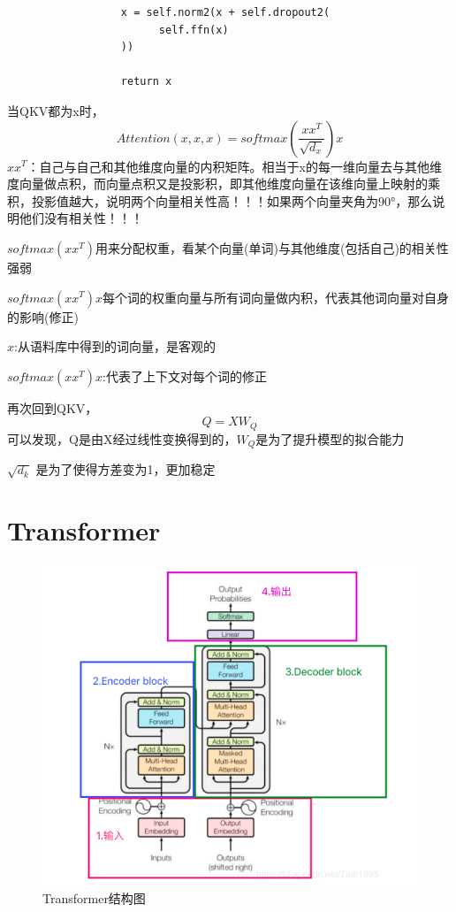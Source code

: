\documentclass[a4paper]{article}
\begin{document}
\begin{sloppypar}
\begin{lstlisting}
                  x = self.norm2(x + self.dropout2(
                        self.ffn(x)
                  ))

                  return x
      \end{lstlisting}

      当QKV都为x时，
      $$
            Attention(x,x,x)=softmax(\frac{xx^T}{\sqrt{d_x}})x
      $$
      $xx^T$：自己与自己和其他维度向量的内积矩阵。相当于x的每一维向量去与其他维度向量做点积，而向量点积又是投影积，即其他维度向量在该维向量上映射的乘积，投影值越大，说明两个向量相关性高！！！如果两个向量夹角为90°，那么说明他们没有相关性！！！

      $softmax(xx^T)$用来分配权重，看某个向量(单词)与其他维度(包括自己)的相关性强弱

      $softmax(xx^T)x$每个词的权重向量与所有词向量做内积，代表其他词向量对自身的影响(修正)

      $x$:从语料库中得到的词向量，是客观的

      $softmax(xx^T)x$:代表了上下文对每个词的修正

      再次回到QKV，
      $$
            Q=XW_Q
      $$
      可以发现，Q是由X经过线性变换得到的，$W_Q$是为了提升模型的拟合能力

      $\sqrt{d_k}$ 是为了使得方差变为1，更加稳定

      \section{Transformer}

      \begin{figure}[ht]
            \centering
            \includegraphics[scale=0.75]{transformer}
            \caption{Transformer结构图}
            \label{Transformer}
      \end{figure}


\end{sloppypar}
\end{document}
